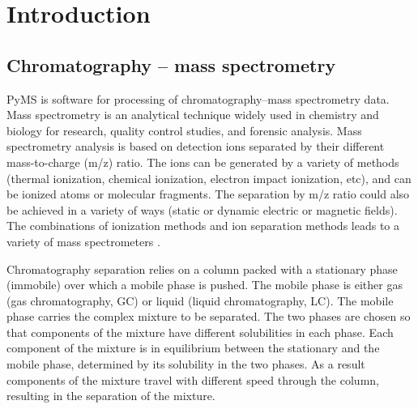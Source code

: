 

\chapter{Introduction}

\section{Chromatography -- mass spectrometry}

PyMS is software for processing of chromatography--mass spectrometry
data. Mass spectrometry is an analytical technique widely used in chemistry
and biology for research, quality control studies, and forensic analysis.
Mass spectrometry analysis is based on detection ions separated by 
their different mass-to-charge (m/z) ratio. The ions can be generated
by a variety of methods (thermal ionization, chemical ionization,
electron impact ionization, etc), and can be ionized atoms or molecular
fragments. The separation by m/z ratio could also be achieved in a
variety of ways (static or dynamic electric or magnetic fields). The
combinations of ionization methods and ion separation methods leads
to a variety of mass spectrometers \cite{gross04}.

Chromatography separation relies on a column packed with a stationary
phase (immobile) over which a mobile phase is pushed. The mobile phase
is either gas (gas chromatography, GC) or liquid (liquid chromatography,
LC). The mobile phase carries the complex mixture to be separated. The
two phases are chosen so that components of the mixture have different
solubilities in each phase. Each component of the mixture is in
equilibrium between the stationary and the mobile phase, determined
by its solubility in the two phases. As a result components of the
mixture travel with different speed through the column, resulting in
the separation of the mixture. 

